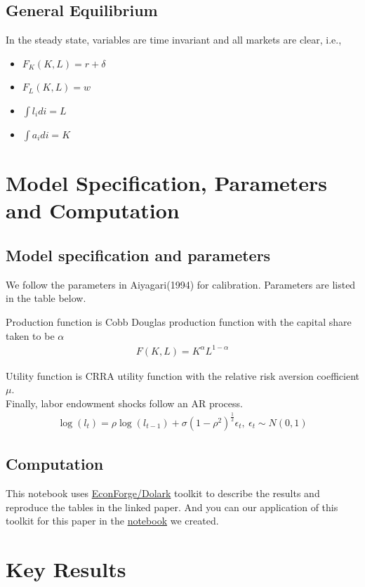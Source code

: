 \documentclass[]{article}
\begin{document}
\subsection{General Equilibrium}
In the steady state, variables are time invariant and all markets are clear, i.e.,
\begin{itemize}
	\item $F_K(K,L) = r+\delta$ 
	\item $F_L(K,L) = w$
	\item $\int l_i di = L$
	\item $\int a_i di = K$	
\end{itemize}


\section{Model Specification, Parameters and Computation}
\subsection{Model specification and parameters}
We follow the parameters in Aiyagari(1994) for calibration. Parameters are listed in the table below. 


Production function is Cobb Douglas production function with the capital share taken to be $\alpha$
\begin{align}
	F(K,L) = K^\alpha L^{1-\alpha}
\end{align}

Utility function is CRRA utility function with the relative risk aversion coefficient $\mu$.\\

Finally, labor endowment shocks follow an AR process.
\begin{align}
\log(l_t)=\rho\log(l_{t-1})+\sigma(1-\rho^2)^{\frac{1}{2}}\epsilon_{t}, \ \epsilon_t \sim N(0,1)   
\end{align}



\subsection{Computation}
This notebook uses \href{http://www.econforge.org/dolark/}{EconForge/Dolark} toolkit to describe the results and reproduce the tables in the linked paper. And you can our application of this toolkit for this paper in the \href{run:../Aiyagari1994QJE.ipynb}{notebook} we created.


\section{Key Results}
\end{document}
